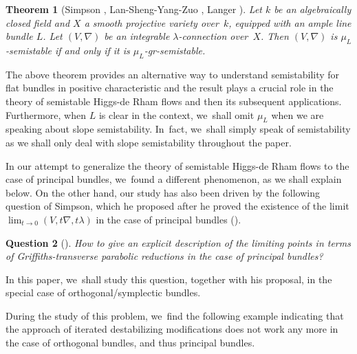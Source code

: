 \documentclass[JEP,XML,SOM,Unicode,published]{cedram}
\newcommand{\lconnection}{$\lambda$\nobreakdash-con\-nec\-tion\xspace}
\newcommand{\grsemistable}{gr\nobreakdash-semi\-stable\xspace}
\theoremstyle{plain}
\newtheorem{thm}{Theorem}[section]
\newtheorem{ques}[thm]{Question}
\theoremstyle{definition}
\begin{document}
\begin{thm}[{Simpson \cite[Th.\,2.5]{S10}, Lan-Sheng-Yang-Zuo \cite[Th.\,A.4]{LSZ19}, Langer \cite[Th.\,5.5]{L13}}]\label{the case of flat bundles}
Let $k$ be an algebraically closed field and $X$ a smooth projective variety over~$k$, equipped with an ample line bundle $L$. Let $(V,\nabla)$ be an integrable \lconnection over~$X$. Then $(V,\nabla)$ is $\mu_L$-semistable if and only if it is $\mu_L$-\grsemistable.
\end{thm}
The above theorem provides an alternative way to understand semistability for flat bundles in positive characteristic and the result plays a crucial role in the theory of semistable Higgs-de Rham flows \cite{LSZ19} and then its subsequent applications. Furthermore, when $L$ is clear in the context, we~shall omit $\mu_L$ when we are speaking about slope semistability. In~fact, we~shall simply speak of semistability as we shall only deal with slope semistability throughout the paper.

In our attempt to generalize the theory of semistable Higgs-de Rham flows to the case of principal bundles, we~found a different phenomenon, as we shall explain below. On the other hand, our study has also been driven by the following question of Simpson, which he proposed after he proved the existence of the limit $\lim_{t \to 0} (V, t\nabla, t\lambda)$ in the case of principal bundles (\cite[Cor.\,8.3]{S10}).
\begin{ques}[{\cite[Quest.\,8.4]{S10}}]\label{quest_simp}
How to give an explicit description of the limiting points in terms of Griffiths-transverse parabolic reductions in the case of principal bundles?
\end{ques}
In this paper, we~shall study this question, together with his proposal, in the special case of orthogonal/symplectic bundles.

During the study of this problem, we~find the following example indicating that the approach of iterated destabilizing modifications does not work any more in the case of orthogonal bundles, and thus principal bundles.
\end{document}
